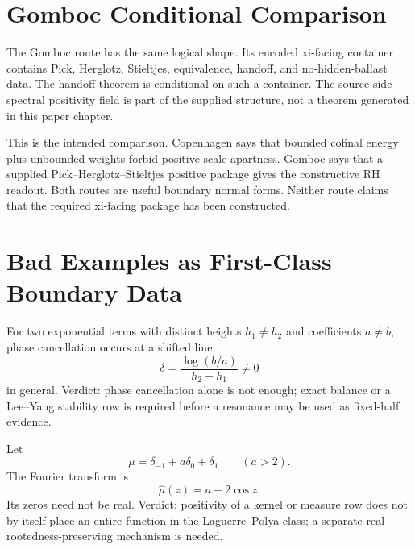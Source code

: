 \section{Gomboc Conditional Comparison}
\label{sec:rh-copenhagen-gomboc-conditional-comparison}

The Gomboc route has the same logical shape.  Its encoded xi-facing
container
contains Pick, Herglotz, Stieltjes, equivalence, handoff, and
no-hidden-ballast data.  The handoff theorem
is conditional on such a container.  The source-side spectral positivity
field
is part of the supplied structure, not a theorem generated in this paper
chapter.

This is the intended comparison.  Copenhagen says that bounded cofinal
energy plus unbounded weights forbid positive scale apartness.  Gomboc
says that a supplied Pick--Herglotz--Stieltjes positive package gives the
constructive RH readout.  Both routes are useful boundary normal forms.
Neither route claims that the required xi-facing package has been
constructed.

\section{Bad Examples as First-Class Boundary Data}
\label{sec:rh-copenhagen-bad-examples}

\begin{principle}
\label{prin:rh-bad-example-two-term-resonance}
For two exponential terms with distinct heights $h_1\ne h_2$ and
coefficients $a\ne b$, phase cancellation occurs at a shifted line
$$
\delta=\frac{\log(b/a)}{h_2-h_1}\ne0
$$
in general.  Verdict: phase cancellation alone is not enough; exact
balance or a Lee--Yang stability row is required before a resonance may
be used as fixed-half evidence.
\end{principle}

\begin{principle}
\label{prin:rh-bad-example-positive-kernel-not-lp}
Let
$$
\mu=\delta_{-1}+a\delta_0+\delta_1
\qquad (a>2).
$$
The Fourier transform is
$$
\widehat{\mu}(z)=a+2\cos z.
$$
Its zeros need not be real.  Verdict: positivity of a kernel or measure
row does not by itself place an entire function in the
Laguerre--Polya class; a separate real-rootedness-preserving mechanism is
needed.
\end{principle}

